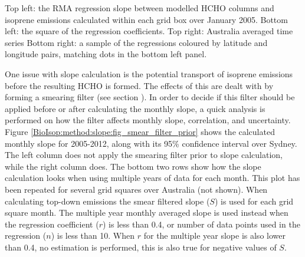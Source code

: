     
    { %
      Top left: the RMA regression slope between modelled HCHO columns and isoprene emissions calculated within each grid box over January 2005.
      Bottom left: the square of the regression coefficients.
      Top right: Australia averaged time series 
      Bottom right: a sample of the regressions coloured by latitude and longitude pairs, matching dots in the bottom left panel.
    }
    {\label{BioIsop:method:slope:fig_regressions}}
    
    One issue with slope calculation is the potential transport of isoprene emissions before the resulting HCHO is formed.
    The effects of this are dealt with by forming a smearing filter (see section ).
    In order to decide if this filter should be applied before or after calculating the monthly slope, a quick analysis is performed on how the filter affects monthly slope, correlation, and uncertainty.
    Figure \ref{BioIsop:method:slope:fig_smear_filter_prior} shows the calculated monthly slope for 2005-2012, along with its 95\% confidence interval over Sydney.
    The left column does not apply the smearing filter prior to slope calculation, while the right column does.
    The bottom two rows show how the slope calculation looks when using multiple years of data for each month.
    This plot has been repeated for several grid squares over Australia (not shown).
    When calculating top-down emissions the smear filtered slope ($S$) is used for each grid square month.
    The multiple year monthly averaged slope is used instead when the regression coefficient ($r$) is less than 0.4, or number of data points used in the regression ($n$) is less than 10.
    When $r$ for the multiple year slope is also lower than 0.4, no estimation is performed, this is also true for negative values of $S$.
    
    
